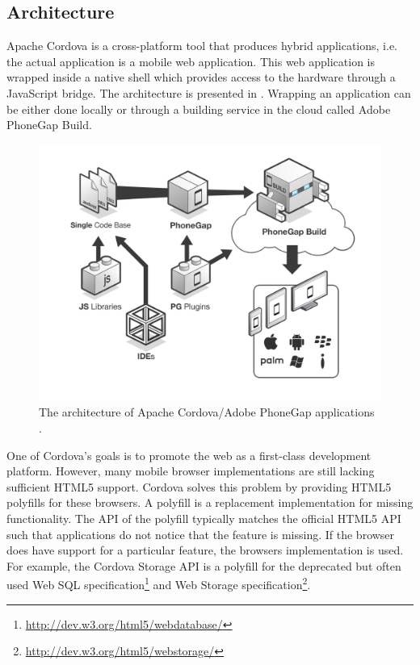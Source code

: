 \subsection{Architecture}
\label{sec:cordova:architecture}

Apache Cordova is a cross-platform tool that produces hybrid applications, i.e. the actual application is a mobile web application. This web application is wrapped inside a native shell which provides access to the hardware through a JavaScript bridge. The architecture is presented in . Wrapping an application can be either done locally or through a building service in the cloud called Adobe PhoneGap Build.

\begin{figure}
    \begin{center}
        \includegraphics[width=.8\textwidth]{../resources/figs/cordova-architecture.png}
        \caption{The architecture of Apache Cordova/Adobe PhoneGap applications \cite{PhoneGap:Overview}.}
        \label{fig:cordova:architecture}
    \end{center}
\end{figure}

One of Cordova's goals is to promote the web as a first-class development platform. However, many mobile browser implementations are still lacking sufficient HTML5 support. Cordova solves this problem by providing HTML5 polyfills for these browsers. A polyfill is a replacement implementation for missing functionality. The API of the polyfill typically matches the official HTML5 API such that applications do not notice that the feature is missing. If the browser does have support for a particular feature, the browsers implementation is used. For example, the Cordova Storage API is a polyfill for the deprecated but often used Web SQL specification\footnote{\url{http://dev.w3.org/html5/webdatabase/}} and Web Storage specification\footnote{\url{http://dev.w3.org/html5/webstorage/}}. 

